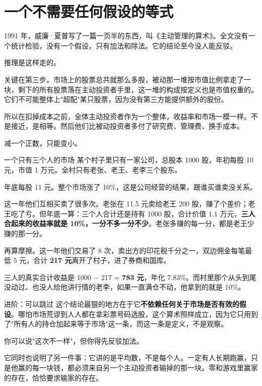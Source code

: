 \section{一个不需要任何假设的等式}

1991 年，威廉·夏普写了一篇一页半的东西，叫《主动管理的算术》。全文没有一个统计检验，没有一个假设，只有加法和除法。它的结论至今没人能反驳。

推理是这样走的。

\begin{chainflow}
\chainarrow {}\chainarrow {}\chainarrow {}\chainarrow {}\chainarrow {}
\end{chainflow}

关键在第三步。市场上的股票总共就那么多股，被动那一堆按市值比例拿走了一块，剩下的所有股票落在主动投资者手里，这一堆的构成按定义也是市值权重的。它们不可能整体上"超配"某只股票，因为没有第三方能提供额外的股份。

所以在扣掉成本之前，全体主动投资者作为一个整体，收益率和市场一模一样。不是接近，是相等。然后他们比被动投资者多付了研究费、管理费、换手成本。

减一个正数，只能变小。

\begin{egbox}{一个只有三个人的市场}
某个村子里只有一家公司，总股本 1000 股，年初每股 10 元，市值 1 万元。全村只有老张、老王、老李三个股东。

年底每股 11 元。整个市场涨了 10\%，这是公司经营的结果，跟谁买谁卖没关系。

这一年他们互相买卖了很多次。老张在 11.5 元卖给老王 200 股，赚了个差价；老王吃了亏。但年底一算：三个人合计还是持有 1000 股，合计价值 1.1 万元，\textbf{三人合起来的收益率就是 10\%，一分不多一分不少}。老张多赚的每一分，都是老王少赚的那一分。

再算摩擦。这一年他们交易了 8 次，卖出方的印花税千分之一，双边佣金每笔最低 5 元，合计 \textbf{217 元}离开了村子，进了券商和国库。

三人的真实合计收益是 1000 − 217 = \textbf{783 元}，年化 7.83\%。而村里那个从头到尾没动过、也没人给他讲行情的老李，如果一直满仓不动，他拿到的就是 10\%。

\end{egbox}

\begin{deepbox}{进阶：可以跳过}
这个结论最狠的地方在于它\textbf{不依赖任何关于市场是否有效的假设}。哪怕市场荒谬到人人都在拿彩票号码选股，这个算术照样成立，因为它只用到了"所有人的持仓加起来等于市场"这一条，而这一条是定义，不是观察。

你可以说"这次不一样"，但你得先反驳加法。

它同时也说明了另一件事：它讲的是平均数，不是每个人。一定有人长期跑赢，只是他赢的每一块钱，都必须来自另一个主动投资者输掉的那一块。零和游戏里赢家的存在，恰恰要求输家的存在。

\end{deepbox}

